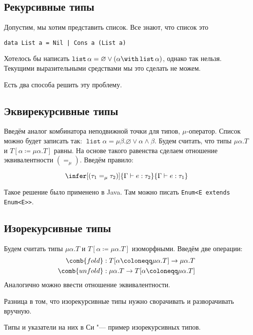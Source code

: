\subsection{\texorpdfstring{Рекурсивные типы}{Recursive types}}
Допустим, мы хотим представить список. Все знают, что список это 
\begin{verbatim}
data List a = Nil | Cons a (List a)
\end{verbatim}
Хотелось бы написать $\operatorname{\mathtt{list}}\alpha=\varnothing\lor(\alpha\with\operatorname{\mathtt{list}}\alpha)$,
однако так нельзя.
Текущими выразительными средствами мы это сделать не можем.

Есть два способа решить эту проблему.

\subsection*{\texorpdfstring{Эквирекурсивные типы}{Equirecursive types}}
Введём аналог комбинатора неподвижной точки для типов, $\mu$-оператор.
Список можно будет записать так: $\operatorname{\mathtt{list}} \alpha = \mu \beta . \varnothing \lor \alpha \land \beta$.
Будем считать, что типы $\mu \alpha . T$ и $T[\alpha \coloneqq \mu \alpha.T]$ равны.
На основе такого равенства сделаем отношение эквивалентности $(=_\mu)$.
Введём правило:
\begin{bnf}
\[
    \infer[(\tau_1=_\mu \tau_2)]
        {\Gamma \vdash e : \tau_2}
        {\Gamma \vdash e : \tau_1}
\]
\end{bnf}

Такое решение было применено в Java. Там можно писать \texttt{Enum<E extends Enum<E>>}.

\subsection*{\texorpdfstring{Изорекурсивные типы}{Isorecursive types}}
Будем считать типы $\mu \alpha . T$ и $T[\alpha \coloneqq \mu \alpha.T]$ изоморфными.
Введём две операции:
\begin{align*}
    \comb{fold}   &: T[\alpha \coloneqq \mu \alpha.T] \rightarrow \mu \alpha . T \\
    \comb{unfold} &: \mu \alpha . T \rightarrow T[\alpha \coloneqq \mu \alpha.T]
\end{align*}
Аналогично можно ввести отношение эквивалентности.

Разница в том, что изорекурсивные типы нужно сворачивать и разворачивать вручную.

Типы и указатели на них в Си "--- пример изорекурсивных типов.
